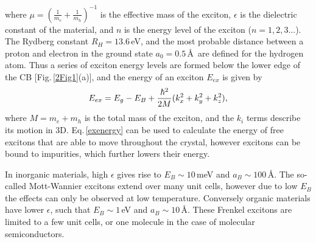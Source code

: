 where $\mu = (\frac{1}{m_e}+\frac{1}{m_h})^{-1}$ is the effective mass of the exciton, $\epsilon$ is the dielectric constant of the material, and $n$ is the energy level of the exciton ($n=1, 2, 3...$). The Rydberg constant $R_H=13.6$\,eV, and the most probable distance between a proton and electron in the ground state $a_0=0.5$\,\AA\, are defined for the hydrogen atom. Thus a series of exciton energy levels are formed below the lower edge of the CB [Fig.\,\ref{2Fig1}(a)], and the energy of an exciton $E_{ex}$ is given by
\begin{equation}
\centering
E_{ex} = E_g - E_B + \frac{\hbar^2}{2M}(k_x^2+k_y^2+k_z^2),
\label{exenergy}
\end{equation}
where $M = m_e+m_h$ is the total mass of the exciton, and the $k_i$ terms describe its motion in 3D. Eq.\,\ref{exenergy} can be used to calculate the energy of free excitons that are able to move throughout the crystal, however excitons can be bound to impurities, which further lowers their energy.

In inorganic materials, high $\epsilon$ gives rise to $E_B \sim 10$\,meV and $a_B \sim 100$\,\AA. The so-called Mott-Wannier excitons extend over many unit cells, however due to low $E_B$ the effects can only be observed at low temperature. Conversely organic materials have lower $\epsilon$, such that $E_B \sim 1$\,eV and $a_B \sim 10$\,\AA. These Frenkel excitons are limited to a few unit cells, or one molecule in the case of molecular semiconductors.

